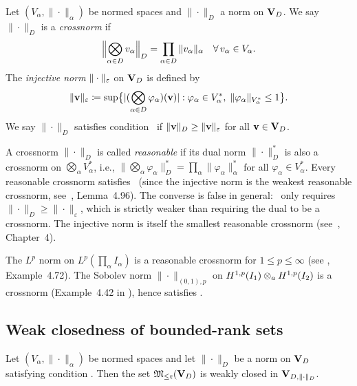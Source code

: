 \begin{definition}
\label{def:crossnorm}
Let $(V_\alpha, \|\cdot\|_\alpha)$ be normed spaces and $\|\cdot\|_D$
a norm on $\mathbf{V}_D$. We say $\|\cdot\|_D$ is a \emph{crossnorm} if
\begin{equation}
\label{eq:crossnorm}
    \Bigl\|\bigotimes_{\alpha \in D} v_\alpha\Bigr\|_D
    = \prod_{\alpha \in D} \|v_\alpha\|_\alpha
    \quad \forall\, v_\alpha \in V_\alpha.
\end{equation}
The \emph{injective norm} $\|\cdot\|_\varepsilon$ on $\mathbf{V}_D$ is defined by
\begin{equation*}
    \|\mathbf{v}\|_\varepsilon
    \coloneqq \sup\bigl\{
        |(\bigotimes_{\alpha \in D} \varphi_\alpha)(\mathbf{v})| :
        \varphi_\alpha \in V_\alpha^*,\;
        \|\varphi_\alpha\|_{V_\alpha^*} \leq 1
    \bigr\}.
\end{equation*}
We say $\|\cdot\|_D$ satisfies condition \condINJ\ if
$\|\mathbf{v}\|_D \geq \|\mathbf{v}\|_\varepsilon$ for all $\mathbf{v} \in \mathbf{V}_D$.
\end{definition}

A crossnorm $\|\cdot\|_D$ is called \emph{reasonable} if its dual norm
$\|\cdot\|_D^*$ is also a crossnorm on $\bigotimes_\alpha V_\alpha^*$,
i.e., $\|\bigotimes_\alpha \varphi_\alpha\|_D^* =
\prod_\alpha \|\varphi_\alpha\|_{\alpha}^*$ for all
$\varphi_\alpha \in V_\alpha^*$.
Every reasonable crossnorm satisfies \condINJ\ (since the injective norm
is the weakest reasonable crossnorm, see~\cite{Hackbusch2019},
Lemma~4.96). The converse is false in general: \condINJ\ only requires
$\|\cdot\|_D \geq \|\cdot\|_\varepsilon$, which is strictly weaker than
requiring the dual to be a crossnorm.
The injective norm is itself the smallest reasonable crossnorm
(see~\cite{Hackbusch2019}, Chapter~4).

\begin{remark}
\label{rem:crossnorm_examples}
The $L^p$ norm on $L^p(\prod_\alpha I_\alpha)$ is a reasonable
crossnorm for $1 \leq p \leq \infty$
(see \cite{Hackbusch2019}, Example~4.72).
The Sobolev norm $\|\cdot\|_{(0,1),p}$ on
$H^{1,p}(I_1) \otimes_a H^{1,p}(I_2)$ is a crossnorm
(Example~4.42 in \cite{Hackbusch2019}), hence satisfies \condINJ.
\end{remark}

\subsection*{Weak closedness of bounded-rank sets}

\begin{theorem}
\label{thm:weak_closed}
Let $(V_\alpha, \|\cdot\|_\alpha)$ be normed spaces and let
$\|\cdot\|_D$ be a norm on $\mathbf{V}_D$ satisfying condition \condINJ.
Then the set $\mathfrak{M}_{\leq\mathfrak{r}}(\mathbf{V}_D)$ is weakly closed in $\mathbf{V}_{D,\|\cdot\|_D}$.
\end{theorem}

